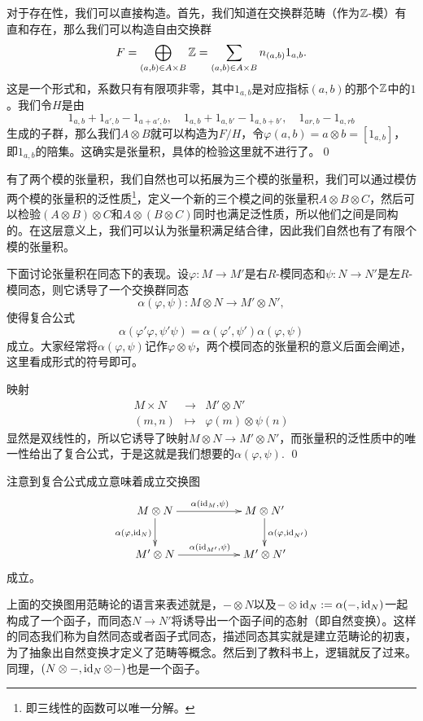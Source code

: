 对于存在性，我们可以直接构造。首先，我们知道在交换群范畴（作为$\mathbb{Z}$-模）有直和存在，那么我们可以构造自由交换群
\[
	F=\bigoplus_{(a,b)\in A\times B} \mathbb{Z}=\sum_{(a,b)\in A\times B}n_{(a,b)}1_{a,b}.
\]
这是一个形式和，系数只有有限项非零，其中$1_{a,b}$是对应指标$(a,b)$的那个$\mathbb{Z}$中的$1$。我们令$H$是由
\[
	1_{a,b}+1_{a',b}-1_{a+a',b},\quad 1_{a,b}+1_{a,b'}-1_{a,b+b'},\quad 1_{ar,b}-1_{a,rb}
\]
生成的子群，那么我们$A\otimes B$就可以构造为$F/H$，令$\varphi(a,b)=a\otimes b=[1_{a,b}]$，即$1_{a,b}$的陪集。这确实是张量积，具体的检验这里就不进行了。\qed

\para 有了两个模的张量积，我们自然也可以拓展为三个模的张量积，我们可以通过模仿两个模的张量积的泛性质\footnote{即三线性的函数可以唯一分解。}，定义一个新的三个模之间的张量积$A\otimes B\otimes C$，然后可以检验$(A\otimes B)\otimes C$和$A\otimes (B\otimes C)$同时也满足泛性质，所以他们之间是同构的。在这层意义上，我们可以认为张量积满足结合律，因此我们自然也有了有限个模的张量积。

\para 下面讨论张量积在同态下的表现。设$\varphi:M\to M'$是右$R$-模同态和$\psi:N\to N'$是左$R$-模同态，则它诱导了一个交换群同态
\[
	\alpha(\varphi,\psi):M\otimes N\to M'\otimes N',
\]
使得复合公式
\[
	\alpha(\varphi'\varphi,\psi'\psi)=\alpha(\varphi',\psi')\alpha(\varphi,\psi)
\]
成立。大家经常将$\alpha(\varphi,\psi)$记作$\varphi\otimes \psi$，两个模同态的张量积的意义后面会阐述，这里看成形式的符号即可。

\proof
	映射
	\[
	\begin{array}{ccc}
		M\times N&\to& M'\otimes N'\\
		(m,n)&\mapsto& \varphi(m)\otimes \psi(n)
	\end{array}
	\]
	显然是双线性的，所以它诱导了映射$M\otimes N\to M'\otimes N'$，而张量积的泛性质中的唯一性给出了复合公式，于是这就是我们想要的$\alpha(\varphi,\psi)$.
\qed

注意到复合公式成立意味着成立交换图
\[
\begin{xy}
	\xymatrix
	{
		M\otimes N\ar[rr]^{\alpha(\id_M,\psi)}\ar[d]_{\alpha(\varphi,\id_{N})}&&M\otimes N'\ar[d]^{\alpha(\varphi,\id_{N'})}\\
		M'\otimes N\ar[rr]^{\alpha(\id_{M'},\psi)}&&M'\otimes N'
	}
\end{xy}
\]
成立。

上面的交换图用范畴论的语言来表述就是，$-\otimes N$以及$-\otimes \operatorname{id}_N:=\alpha(-,\operatorname{id}_N)$一起构成了一个函子，而同态$N\to N'$将诱导出一个函子间的态射（即自然变换）。这样的同态我们称为自然同态或者函子式同态，描述同态其实就是建立范畴论的初衷，为了抽象出自然变换才定义了范畴等概念。然后到了教科书上，逻辑就反了过来。同理，$(N\otimes -,\operatorname{id}_N\otimes -)$也是一个函子。

